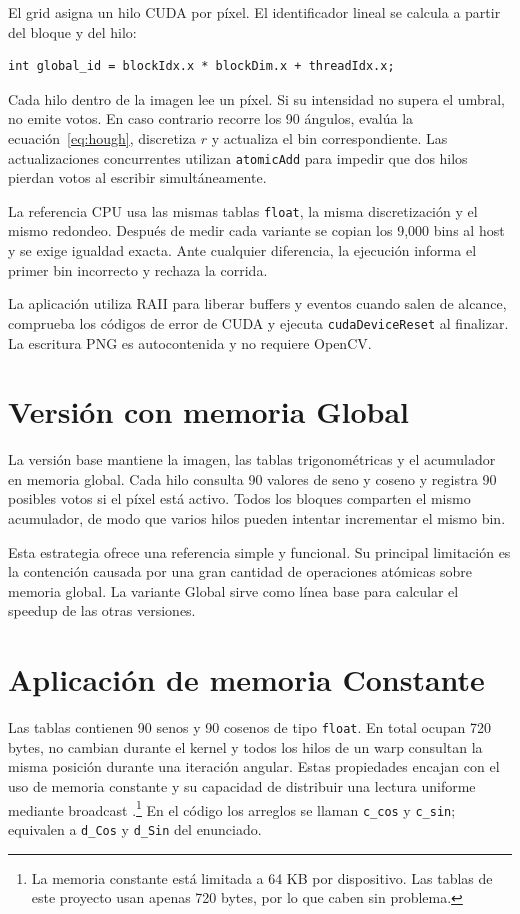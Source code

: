 \documentclass[12pt,letterpaper]{article}
\begin{document}
El grid asigna un hilo CUDA por píxel. El identificador lineal se calcula a partir del bloque y del hilo:

\begin{lstlisting}
int global_id = blockIdx.x * blockDim.x + threadIdx.x;
\end{lstlisting}

Cada hilo dentro de la imagen lee un píxel. Si su intensidad no supera el umbral, no emite votos. En caso contrario recorre los 90 ángulos, evalúa la ecuación~\ref{eq:hough}, discretiza $r$ y actualiza el bin correspondiente. Las actualizaciones concurrentes utilizan \texttt{atomicAdd} para impedir que dos hilos pierdan votos al escribir simultáneamente.

La referencia CPU usa las mismas tablas \texttt{float}, la misma discretización y el mismo redondeo. Después de medir cada variante se copian los 9,000 bins al host y se exige igualdad exacta. Ante cualquier diferencia, la ejecución informa el primer bin incorrecto y rechaza la corrida.

La aplicación utiliza RAII para liberar buffers y eventos cuando salen de alcance, comprueba los códigos de error de CUDA y ejecuta \texttt{cudaDeviceReset} al finalizar. La escritura PNG es autocontenida y no requiere OpenCV.

\section{Versión con memoria Global}

La versión base mantiene la imagen, las tablas trigonométricas y el acumulador en memoria global. Cada hilo consulta 90 valores de seno y coseno y registra 90 posibles votos si el píxel está activo. Todos los bloques comparten el mismo acumulador, de modo que varios hilos pueden intentar incrementar el mismo bin.

Esta estrategia ofrece una referencia simple y funcional. Su principal limitación es la contención causada por una gran cantidad de operaciones atómicas sobre memoria global. La variante Global sirve como línea base para calcular el speedup de las otras versiones.

\section{Aplicación de memoria Constante}

Las tablas contienen 90 senos y 90 cosenos de tipo \texttt{float}. En total ocupan 720 bytes, no cambian durante el kernel y todos los hilos de un warp consultan la misma posición durante una iteración angular. Estas propiedades encajan con el uso de memoria constante y su capacidad de distribuir una lectura uniforme mediante broadcast \cite{cuda-guide}.\footnote{La memoria constante está limitada a 64 KB por dispositivo. Las tablas de este proyecto usan apenas 720 bytes, por lo que caben sin problema.} En el código los arreglos se llaman \texttt{c\_cos} y \texttt{c\_sin}; equivalen a \texttt{d\_Cos} y \texttt{d\_Sin} del enunciado.
\end{document}
